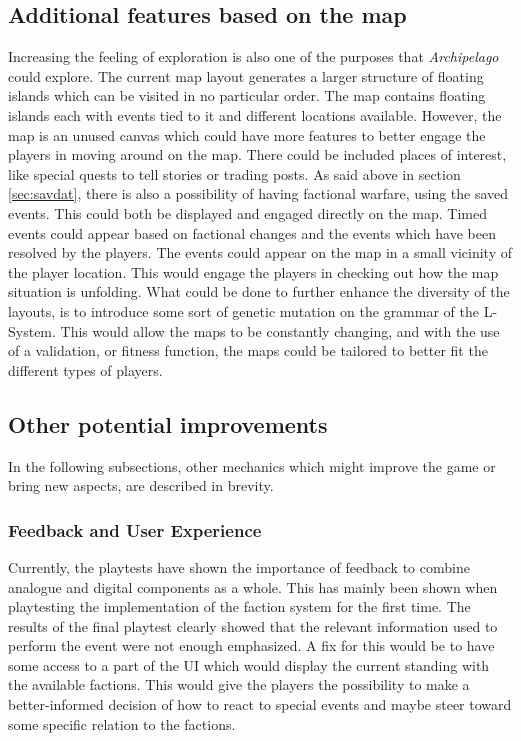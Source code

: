 \subsection{Additional features based on the map}
Increasing the feeling of exploration is also one of the purposes that \textit{Archipelago} could explore. The current map layout generates a larger structure of floating islands which can be visited in no particular order. The map contains floating islands each with events tied to it and different locations available. However, the map is an unused canvas which could have more features to better engage the players in moving around on the map. 
There could be included places of interest, like special quests to tell stories or trading posts.
As said above in section \ref{sec:savdat}, there is also a possibility of having factional warfare, using the saved events. This could both be displayed and engaged directly on the map. Timed events could appear based on factional changes and the events which have been resolved by the players. The events could appear on the map in a small vicinity of the player location. This would engage the players in checking out how the map situation is unfolding. What could be done to further enhance the diversity of the layouts, is to introduce some sort of genetic mutation on the grammar of the L-System. This would allow the maps to be constantly changing, and with the use of a validation, or fitness function, the maps could be tailored to better fit the different types of players.


\subsection{Other potential improvements}
In the following subsections, other mechanics which might improve the game or bring new aspects, are described in brevity. 
\subsubsection{Feedback and User Experience}
Currently, the playtests have shown the importance of feedback to combine analogue and digital components as a whole. This has mainly been shown when playtesting the implementation of the faction system for the first time. The results of the final playtest clearly showed that the relevant information used to perform the event were not enough emphasized.
A fix for this would be to have some access to a part of the UI which would display the current standing with the available factions. This would give the players the possibility to make a better-informed decision of how to react to special events and maybe steer toward some specific relation to the factions.



